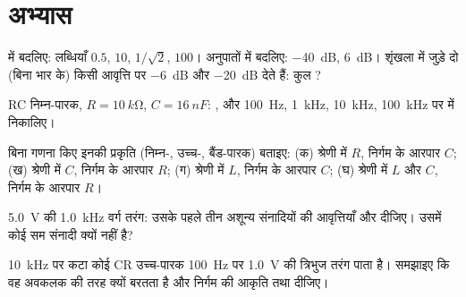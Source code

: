 \section{अभ्यास}

\begin{exercise}[$\star$]\label{exo:b1:filters-transfer-functions:1}
 में बदलिए: लब्धियाँ $0.5$, $10$, $1/\sqrt2$, $100$। अनुपातों में
बदलिए: \qty{-40}{dB}, \qty{+6}{dB}। शृंखला में जुड़े दो  (बिना भार के)
किसी आवृत्ति पर \qty{-6}{dB} और \qty{-20}{dB} देते हैं: कुल ?
\end{exercise}

\begin{exercise}[$\star$]\label{exo:b1:filters-transfer-functions:2}
RC निम्न-पारक, $R = \qty{10}{k\ohm}$, $C = \qty{16}{nF}$: ,
और \qty{100}{Hz}, \qty{1}{kHz}, \qty{10}{kHz},
\qty{100}{kHz} पर  में  निकालिए।
\end{exercise}

\begin{exercise}[$\star$]\label{exo:b1:filters-transfer-functions:3}
बिना गणना किए इनकी प्रकृति (निम्न-, उच्च-, बैंड-पारक) बताइए: (क)
श्रेणी में $R$, निर्गम के आरपार $C$; (ख) श्रेणी में $C$, निर्गम के आरपार
$R$; (ग) श्रेणी में $L$, निर्गम के आरपार $C$; (घ) श्रेणी में $L$ और $C$,
निर्गम के आरपार $R$।
\end{exercise}

\begin{exercise}[$\star$]\label{exo:b1:filters-transfer-functions:4}
 \qty{5.0}{V} की \qty{1.0}{kHz} वर्ग तरंग: उसके पहले तीन अशून्य
संनादियों की आवृत्तियाँ और  दीजिए। उसमें कोई सम संनादी क्यों नहीं है?
\end{exercise}

\begin{exercise}[$\star\star$]\label{exo:b1:filters-transfer-functions:5}
\qty{10}{kHz} पर कटा कोई CR उच्च-पारक \qty{100}{Hz} पर 
\qty{1.0}{V} की त्रिभुज तरंग पाता है। समझाइए कि वह अवकलक की तरह क्यों बरतता
है और निर्गम की आकृति तथा  दीजिए।
\end{exercise}

